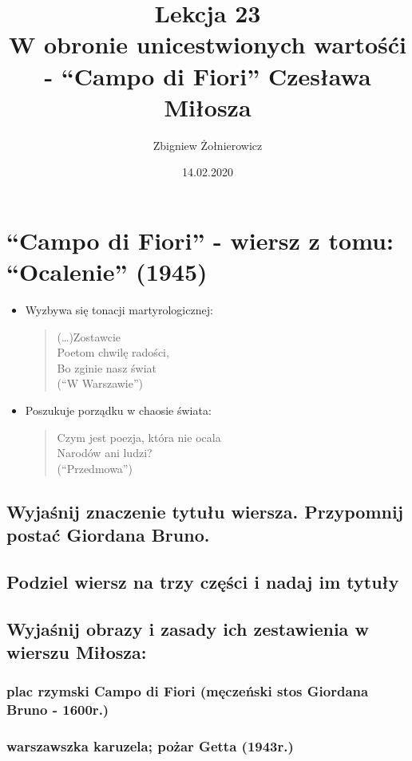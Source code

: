 \documentclass[a4paper]{article}
\begin{document}
\title{{\huge Lekcja 23} \\
{\large W obronie unicestwionych wartośći - ``Campo di Fiori'' Czesława Miłosza}}
\author{Zbigniew Żołnierowicz}
\date{14.02.2020}
\maketitle
\section{``Campo di Fiori'' - wiersz z tomu: ``Ocalenie'' (1945)}
\begin{itemize}
    \item Wyzbywa się tonacji martyrologicznej:
    \begin{quotation}
        (\dots)Zostawcie \\
        Poetom chwilę radości,\\
        Bo zginie nasz świat\\
        (``W Warszawie'')
    \end{quotation}
    \item Poszukuje porządku w chaosie świata:
    \begin{quotation}
        Czym jest poezja, która nie ocala\\
        Narodów ani ludzi?\\
        (``Przedmowa'')
    \end{quotation}
\end{itemize}
\subsection{Wyjaśnij znaczenie tytułu wiersza. Przypomnij po\-stać Giordana Bruno.}
\subsection{Podziel wiersz na trzy części i nadaj im tytuły}
\subsection{Wyjaśnij obrazy i zasady ich zestawienia w wierszu Miłosza:}
\subsubsection{plac rzymski Campo di Fiori (męczeński stos Giordana Bruno - 1600r.)}
\subsubsection{warszawszka karuzela; pożar Getta (1943r.)}
\end{document}
